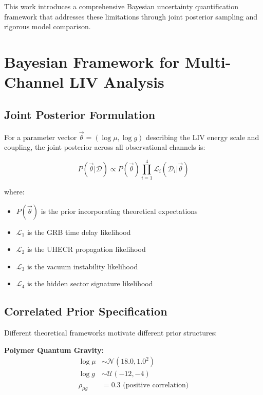 \documentclass[12pt]{article}
\begin{document}
This work introduces a comprehensive Bayesian uncertainty quantification framework that addresses these limitations through joint posterior sampling and rigorous model comparison.

\section{Bayesian Framework for Multi-Channel LIV Analysis}

\subsection{Joint Posterior Formulation}

For a parameter vector $\vec{\theta} = (\log \mu, \log g)$ describing the LIV energy scale and coupling, the joint posterior across all observational channels is:

\begin{equation}
P(\vec{\theta} | \mathcal{D}) \propto P(\vec{\theta}) \prod_{i=1}^4 \mathcal{L}_i(\mathcal{D}_i | \vec{\theta})
\end{equation}

where:
\begin{itemize}
\item $P(\vec{\theta})$ is the prior incorporating theoretical expectations
\item $\mathcal{L}_1$ is the GRB time delay likelihood
\item $\mathcal{L}_2$ is the UHECR propagation likelihood  
\item $\mathcal{L}_3$ is the vacuum instability likelihood
\item $\mathcal{L}_4$ is the hidden sector signature likelihood
\end{itemize}

\subsection{Correlated Prior Specification}

Different theoretical frameworks motivate different prior structures:

\textbf{Polymer Quantum Gravity:}
\begin{align}
\log \mu &\sim \mathcal{N}(18.0, 1.0^2) \\
\log g &\sim \mathcal{U}(-12, -4) \\
\rho_{\mu g} &= 0.3 \text{ (positive correlation)}
\end{align}
\end{document}
